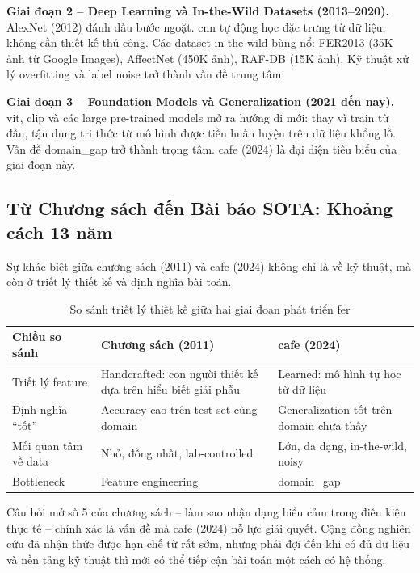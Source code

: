 \documentclass[12pt,a4paper]{article}
\let\oldtextbf\textbf
\renewcommand{\textbf}[1]{\oldtextbf{\textcolor{hcmublue}{#1}}}
\begin{document}
\textbf{Giai đoạn 2 -- Deep Learning và In-the-Wild Datasets (2013--2020).}
AlexNet (2012) đánh dấu bước ngoặt. \gls{cnn} tự động học đặc trưng từ dữ liệu, không cần thiết kế thủ công. Các dataset in-the-wild bùng nổ: FER2013 (35K ảnh từ Google Images), AffectNet (450K ảnh), RAF-DB (15K ảnh). Kỹ thuật xử lý overfitting và label noise trở thành vấn đề trung tâm.

\textbf{Giai đoạn 3 -- Foundation Models và Generalization (2021 đến nay).}
\gls{vit}, \gls{clip} và các large pre-trained models mở ra hướng đi mới: thay vì train từ đầu, tận dụng tri thức từ mô hình được tiền huấn luyện trên dữ liệu khổng lồ. Vấn đề \gls{domain_gap} trở thành trọng tâm. \gls{cafe} (2024) là đại diện tiêu biểu của giai đoạn này.

\subsection{Từ Chương sách đến Bài báo SOTA: Khoảng cách 13 năm}

Sự khác biệt giữa chương sách (2011) và \gls{cafe} (2024) không chỉ là về kỹ thuật, mà còn ở triết lý thiết kế và định nghĩa bài toán.

\begin{table}[H]
\centering
\small
\begin{tabular}{|l|p{4.5cm}|p{4.5cm}|}
\hline
\textbf{Chiều so sánh} & \textbf{Chương sách (2011)} & \textbf{\gls{cafe} (2024)} \\ \hline
Triết lý feature & Handcrafted: con người thiết kế dựa trên hiểu biết giải phẫu & Learned: mô hình tự học từ dữ liệu \\ \hline
Định nghĩa ``tốt'' & Accuracy cao trên test set cùng domain & Generalization tốt trên domain chưa thấy \\ \hline
Mối quan tâm về data & Nhỏ, đồng nhất, lab-controlled & Lớn, đa dạng, in-the-wild, noisy \\ \hline
Bottleneck & Feature engineering & \gls{domain_gap} \\ \hline
\end{tabular}
\caption{So sánh triết lý thiết kế giữa hai giai đoạn phát triển \gls{fer}}
\label{tab:era_comparison}
\end{table}

Câu hỏi mở số 5 của chương sách -- làm sao nhận dạng biểu cảm trong điều kiện thực tế -- chính xác là vấn đề mà \gls{cafe} (2024) nỗ lực giải quyết. Cộng đồng nghiên cứu đã nhận thức được hạn chế từ rất sớm, nhưng phải đợi đến khi có đủ dữ liệu và nền tảng kỹ thuật thì mới có thể tiếp cận bài toán một cách có hệ thống.
\end{document}
